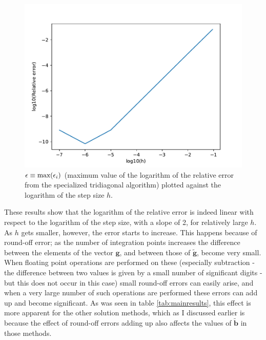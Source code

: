 \documentclass[a4paper,english]{article}
\renewcommand\vec{\mathbf}
\let\originalleft\left
\let\originalright\right
\renewcommand{\left}{\mathopen{}\mathclose\bgroup\originalleft}
\renewcommand{\right}{\aftergroup\egroup\originalright}
\begin{document}
\begin{figure}[ht]
  \centering
  \includegraphics[width=0.84\linewidth]{error_plot.pdf}
  \caption{$\epsilon \equiv \text{max}\left(\epsilon_i\right)$ (maximum value of the logarithm of the relative error from the specialized tridiagonal algorithm) plotted against the logarithm of the step size $h$.}
  \label{fig:error_plot}
\end{figure}
These results show that the logarithm of the relative error is indeed linear with respect to the logarithm of the step size, with a slope of 2, for relatively large $h$. As $h$ gets smaller, however, the error starts to increase. This happens because of round-off error; as the number of integration points increases the difference between the elements of the vector $\vec{g}$, and between those of $\tilde{\vec{g}}$, become very small. When floating point operations are performed on these (especially subtraction - the difference between two values is given by a small number of significant digits - but this does not occur in this case) small round-off errors can easily arise, and when a very large number of such operations are performed these errors can add up and become significant. As was seen in table \ref{tab:mainresults}, this effect is more apparent for the other solution methods, which as I discussed earlier is because the effect of round-off errors adding up also affects the values of $\tilde{\vec{b}}$ in those methods.
\end{document}
